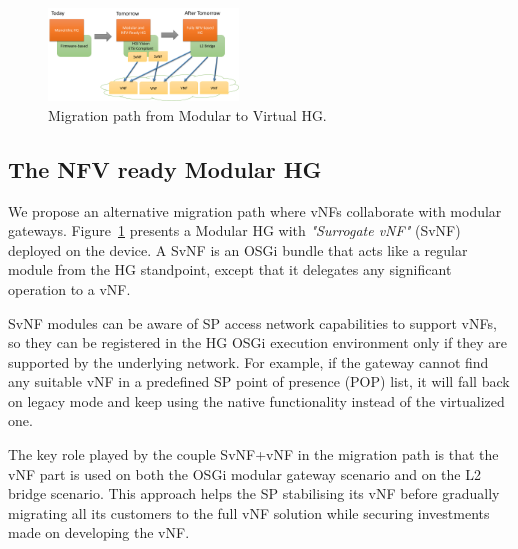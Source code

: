 \begin{figure}
  \begin{center}
    \includegraphics[width=0.45\textwidth,natwidth=6955,natheight=3398]{fig/vhgMigrationPath.png}
  \end{center}
  \caption{ Migration path from Modular to Virtual HG.
    \label{fig:migration}
  }
\end{figure}


\subsection{The NFV ready Modular HG}
We propose an alternative migration path where vNFs collaborate with modular gateways.
Figure~\ref{fig:migration} presents a Modular HG with \textit{"Surrogate vNF"} (SvNF) deployed on the device.
A SvNF is an OSGi bundle that acts like a regular module from the HG standpoint, except that it delegates any significant operation to a vNF.

SvNF modules can be aware of SP access network capabilities to support vNFs, so they can be registered in the HG OSGi execution environment only if they are supported by the underlying network.
For example, if the gateway cannot find any suitable vNF in a predefined SP point of presence (POP) list, it will fall back on legacy mode and keep using the native functionality instead of the virtualized one.

The key role played by the couple SvNF+vNF in the migration path is that the vNF part is used on both the OSGi modular gateway scenario and on the L2 bridge scenario.
This approach helps the SP stabilising its vNF before gradually migrating all its customers to the full vNF solution while securing investments made on developing the vNF.
 
